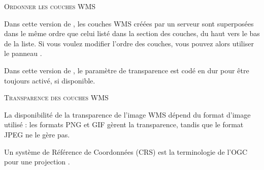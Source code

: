 \begin{Tip}[ht]\caption{\textsc{Ordonner les couches WMS}}

Dans cette version de \qg, les couches WMS créées par un serveur sont superposées dans le même ordre que celui listé dans la section des couches, du haut vers le bas de la liste. Si vous voulez modifier l'ordre des couches, vous pouvez alors utiliser le panneau .
\end{Tip}

\label{ogc-wms-transparency}

Dans cette version de \qg, le paramètre de transparence est codé en dur pour  être toujours activé, si disponible.

\begin{Tip}[ht]\caption{\textsc{Transparence des couches WMS}}
La disponibilité de la transparence de l'image WMS dépend du format d'image utilisé : les formats PNG et GIF gèrent la transparence, tandis que le format JPEG ne le gère pas. 
\end{Tip}


Un système de Référence de Coordonnées (CRS) est la terminologie de l'OGC pour
une projection \qg.

